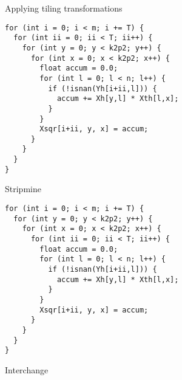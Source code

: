 \begin{frame}[fragile]{Applying tiling transformations}

\begin{minipage}{.55\textwidth}
\begin{verbatim}
for (int i = 0; i < m; i += T) {
  for (int ii = 0; ii < T; ii++) {
    for (int y = 0; y < k2p2; y++) {
      for (int x = 0; x < k2p2; x++) {
        float accum = 0.0;
        for (int l = 0; l < n; l++) {
          if (!isnan(Yh[i+ii,l])) {
            accum += Xh[y,l] * Xth[l,x];
          }
        }
        Xsqr[i+ii, y, x] = accum;
      }
    }
  }
}
\end{verbatim}
\begin{center}
  Stripmine
\end{center}
\end{minipage}%
\begin{minipage}{.5\textwidth}
  \centering
  \begin{verbatim}
for (int i = 0; i < m; i += T) {
  for (int y = 0; y < k2p2; y++) {
    for (int x = 0; x < k2p2; x++) {
      for (int ii = 0; ii < T; ii++) {
        float accum = 0.0;
        for (int l = 0; l < n; l++) {
          if (!isnan(Yh[i+ii,l])) {
            accum += Xh[y,l] * Xth[l,x];
          }
        }
        Xsqr[i+ii, y, x] = accum;
      }
    }
  }
}
\end{verbatim}
\begin{center}
  Interchange
\end{center}
\end{minipage}
\end{frame}

